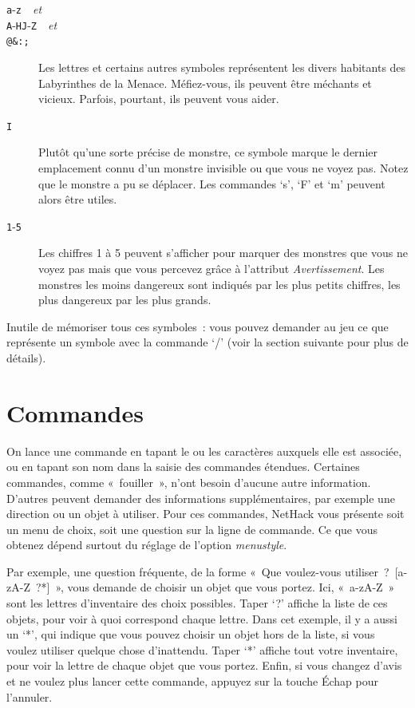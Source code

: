 \documentclass[titlepage]{article}
\begin{document}
\begin{description}
\item[{\texttt{a}-\texttt{z}~~\textit{et}}]

\item[{\texttt{A}-\texttt{H}\texttt{J}-\texttt{Z}~~\textit{et}}]

\item[{\texttt{@\&\textquotesingle{}:;}}]
Les lettres et certains autres symboles représentent les divers habitants
des Labyrinthes de la Menace.
Méfiez-vous, ils peuvent être méchants et vicieux.
Parfois, pourtant, ils peuvent vous aider.

\item[{\texttt{I}}]
Plutôt qu'une sorte précise de monstre, ce symbole marque le dernier
emplacement connu d'un monstre invisible ou que vous ne voyez pas.
Notez que le monstre a pu se déplacer.
Les commandes `s', `F' et `m' peuvent alors être utiles.

\item[{\texttt{1}-\texttt{5}}]
Les chiffres 1 à 5 peuvent s'afficher pour marquer des monstres que vous
ne voyez pas mais que vous percevez grâce à l'attribut
\textit{Avertissement}.
Les monstres les moins dangereux sont indiqués par les plus petits
chiffres, les plus dangereux par les plus grands.

\end{description}

Inutile de mémoriser tous ces symboles~: vous pouvez demander au jeu ce
que représente un symbole avec la commande `/' (voir la section
suivante pour plus de détails).

\section{Commandes}



On lance une commande en tapant le ou les caractères auxquels elle est
associée, ou en tapant son nom dans la saisie des commandes étendues.
Certaines commandes, comme «~fouiller~», n'ont besoin d'aucune autre
information.
D'autres peuvent demander des informations supplémentaires, par exemple
une direction ou un objet à utiliser.
Pour ces commandes, NetHack vous présente soit un menu de choix, soit une
question sur la ligne de commande.
Ce que vous obtenez dépend surtout du réglage de l'option
\textit{menustyle}.


Par exemple, une question fréquente, de la forme «~Que voulez-vous
utiliser~?~[a-zA-Z~?*]~», vous demande de choisir un objet que vous
portez.
Ici, «~a-zA-Z~» sont les lettres d'inventaire des choix possibles.
Taper `?' affiche la liste de ces objets, pour voir à quoi correspond
chaque lettre.
Dans cet exemple, il y a aussi un `*', qui indique que vous pouvez
choisir un objet hors de la liste, si vous voulez utiliser quelque chose
d'inattendu.
Taper `*' affiche tout votre inventaire, pour voir la lettre de
chaque objet que vous portez.
Enfin, si vous changez d'avis et ne voulez plus lancer cette commande,
appuyez sur la touche Échap pour l'annuler.
\end{document}

